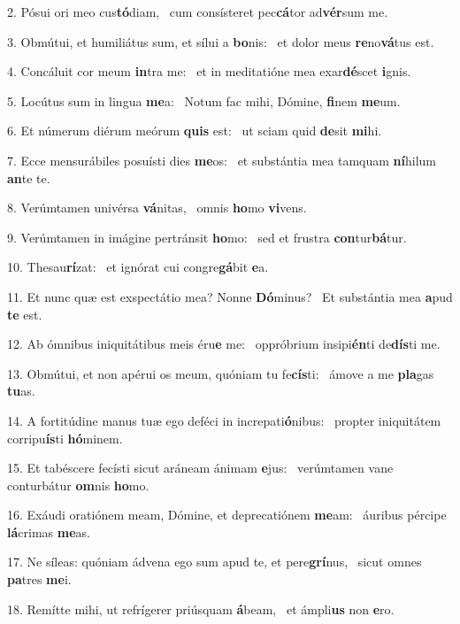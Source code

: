 2. Pósui ori meo cus\textbf{tó}diam, \ast\  cum consísteret pec\textbf{cá}tor ad\textbf{vér}sum me.\

3. Obmútui, et humiliátus sum, et sílui a \textbf{bo}nis: \ast\  et dolor meus \textbf{re}no\textbf{vá}tus est.\

4. Concáluit cor meum \textbf{in}tra me: \ast\  et in meditatióne mea exar\textbf{dé}scet \textbf{i}gnis.\

5. Locútus sum in lingua \textbf{me}a: \ast\  Notum fac mihi, Dómine, \textbf{fi}nem \textbf{me}um.\

6. Et númerum diérum meórum \textbf{quis} est: \ast\  ut sciam quid \textbf{de}sit \textbf{mi}hi.\

7. Ecce mensurábiles posuísti dies \textbf{me}os: \ast\  et substántia mea tamquam \textbf{ní}hilum \textbf{an}te te.\

8. Verúmtamen univérsa \textbf{vá}nitas, \ast\  omnis \textbf{ho}mo \textbf{vi}vens.\

9. Verúmtamen in imágine pertránsit \textbf{ho}mo: \ast\  sed et frustra \textbf{con}tur\textbf{bá}tur.\

10. Thesau\textbf{rí}zat: \ast\  et ignórat cui congre\textbf{gá}bit \textbf{e}a.\

11. Et nunc quæ est exspectátio mea? Nonne \textbf{Dó}minus? \ast\  Et substántia mea \textbf{a}pud \textbf{te} est.\

12. Ab ómnibus iniquitátibus meis éru\textbf{e} me: \ast\  oppróbrium insipi\textbf{én}ti de\textbf{dís}ti me.\

13. Obmútui, et non apérui os meum, quóniam tu fe\textbf{cís}ti: \ast\  ámove a me \textbf{pla}gas \textbf{tu}as.\

14. A fortitúdine manus tuæ ego deféci in increpati\textbf{ó}nibus: \ast\  propter iniquitátem corripu\textbf{ís}ti \textbf{hó}minem.\

15. Et tabéscere fecísti sicut aráneam ánimam \textbf{e}jus: \ast\  verúmtamen vane conturbátur \textbf{om}nis \textbf{ho}mo.\

16. Exáudi oratiónem meam, Dómine, et deprecatiónem \textbf{me}am: \ast\  áuribus pércipe \textbf{lá}crimas \textbf{me}as.\

17. Ne síleas: quóniam ádvena ego sum apud te, et pere\textbf{grí}nus, \ast\  sicut omnes \textbf{pa}tres \textbf{me}i.\

18. Remítte mihi, ut refrígerer priúsquam \textbf{á}beam, \ast\  et ámpli\textbf{us} non \textbf{e}ro.\

